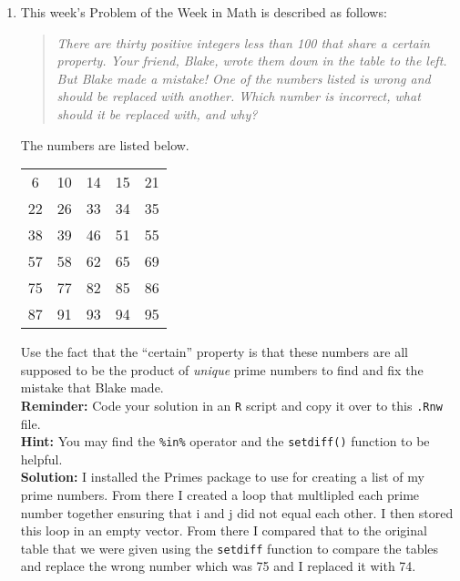 \documentclass{article}\usepackage[]{graphicx}\usepackage[]{xcolor}
\begin{document}
\begin{enumerate}
\item This week's Problem of the Week in Math is described as follows:
\begin{quotation}
  \textit{There are thirty positive integers less than 100 that share a certain 
  property. Your friend, Blake, wrote them down in the table to the left. But 
  Blake made a mistake! One of the numbers listed is wrong and should be replaced 
  with another. Which number is incorrect, what should it be replaced with, and 
  why?}
\end{quotation}
The numbers are listed below.
\begin{center}
  \begin{tabular}{ccccc}
    6 & 10 & 14 & 15 & 21\\
    22 & 26 & 33 & 34 & 35\\
    38 & 39 & 46 & 51 & 55\\
    57 & 58 & 62 & 65 & 69\\
    75 & 77 & 82 & 85 & 86\\
    87 & 91 & 93 & 94 & 95
  \end{tabular}
\end{center}
Use the fact that the ``certain'' property is that these numbers are all supposed
to be the product of \emph{unique} prime numbers to find and fix the mistake that
Blake made.\\
\textbf{Reminder:} Code your solution in an \texttt{R} script and copy it over
to this \texttt{.Rnw} file.\\
\textbf{Hint:} You may find the \verb|%in%| operator and the \verb|setdiff()| function to be helpful.\\

\textbf{Solution:} 
I installed the Primes \citep{primes} package to use for creating a list of my prime numbers. From there I created a loop that multlipled each prime number together ensuring that i and j did not equal each other. I then stored this loop in an empty vector. From there I compared that to the original table that we were given using the \texttt{setdiff} function to compare the tables and replace the wrong number which was 75 and I replaced it with 74. 


\end{enumerate}
\end{document}
